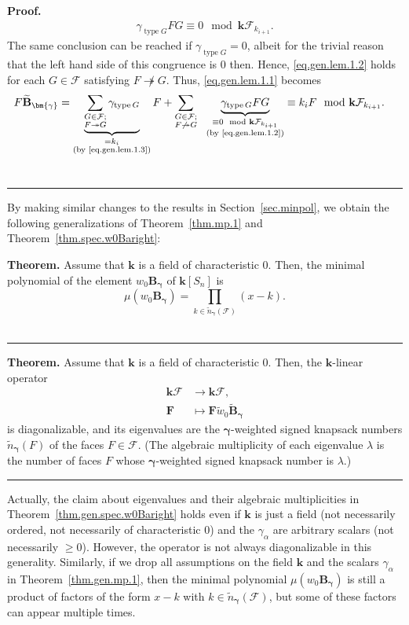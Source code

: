 \documentclass[12pt]{article}
\theoremstyle{definition}%
\newtheorem{thm}{Theorem}[section]
\theoremstyle{definition}%
\theoremstyle{remark}%
\newcommand{\tup}[1]{\left( #1 \right)}
\newcommand{\kk}{\mathbf{k}}
\newcommand{\ksn}{\kk\left[S_n\right]}
\newcommand{\kf}{\kk\mathcal{F}}
\newcommand{\BB}{\mathbf{B}}
\newcommand{\BBt}{\widetilde{\mathbf{B}}}
\newcommand{\FF}{\mathbf{F}}
\newcommand{\CF}{\mathcal{F}}
\newcommand{\bgamma}{\bm{\gamma}}
\newcommand{\wo}{w_0} %
\newcommand{\wotil}{\widetilde{w}_0}
\newcommand{\nn}{\widetilde{n}}%
\newcommand{\type}{\operatorname{type}}
\newcommand{\con}{\twoheadrightarrow} %
\newenvironment{thm}[1][Theorem]{\noindent\textbf{#1.} }{\ \rule{0.5em}{0.5em}}
\newenvironment{proof}[1][Proof]{\noindent\textbf{#1.} }{\ \rule{0.5em}{0.5em}}
\begin{document}
\begin{proof}
   \begin{align}
	   \gamma_{\type G} FG \equiv 0 \mod \kf_{k_{i+1}}.
	   \label{eq.gen.lem.1.2}
   \end{align}
   The same conclusion can be reached if $\gamma_{\type G} = 0$, albeit for the trivial reason that the left hand side of this congruence is $0$ then.
   Hence, \eqref{eq.gen.lem.1.2} holds for each $G \in \CF$ satisfying $F \not\con G$.
   Thus, \eqref{eq.gen.lem.1.1} becomes
   \begin{align*}
       F\BBt_{\bgamma}
       &= \underbrace{\sum_{\substack{G \in \CF; \\ F \con G}} \gamma_{\type G}}_{\substack{= k_i \\ \text{(by \eqref{eq.gen.lem.1.3})}}} F
	   + \sum_{\substack{G \in \CF; \\ F \not\con G}}\ \ \underbrace{\gamma_{\type G} FG}_{\substack{\equiv 0 \mod \kf_{k_{i+1}} \\ \text{(by \eqref{eq.gen.lem.1.2})}}}
	   \equiv k_i F \mod \kf_{k_{i+1}}.
   \end{align*}
\end{proof}

By making similar changes to the results in Section~\ref{sec.minpol}, we obtain the following generalizations of Theorem~\ref{thm.mp.1} and Theorem~\ref{thm.spec.w0Baright}:

\begin{thm}
\label{thm.gen.mp.1}
Assume that $\kk$ is a field of characteristic $0$.
Then, the minimal polynomial of the element $\wo\BB_{\bgamma}$ of $\ksn$ is
\[
\mu\tup{\wo\BB_{\bgamma}}
=
\prod_{k \in \nn_{\bgamma}\tup{\CF}}\tup{x-k}  .
\]
\end{thm}

\begin{thm}
\label{thm.gen.spec.w0Baright}
Assume that $\kk$ is a field of characteristic $0$.
Then, the $\kk$-linear operator
\begin{align*}
\kf  & \to \kf,\\
\FF  & \mapsto \FF\wotil\BBt_{\bgamma}
\end{align*}
is diagonalizable, and its eigenvalues are the $\bgamma$-weighted signed knapsack numbers
$\nn_{\bgamma}\tup{F} $ of the faces $F\in \CF$.
(The algebraic multiplicity of each eigenvalue $\lambda$ is the number of faces $F$
whose $\bgamma$-weighted signed knapsack number is $\lambda$.)
\end{thm}

Actually, the claim about eigenvalues and their algebraic multiplicities in Theorem~\ref{thm.gen.spec.w0Baright} holds even if $\kk$ is just a field (not necessarily ordered, not necessarily of characteristic $0$) and the $\gamma_\alpha$ are arbitrary scalars (not necessarily $\geq 0$).
However, the operator is not always diagonalizable in this generality.
Similarly, if we drop all assumptions on the field $\kk$ and the scalars $\gamma_\alpha$ in Theorem~\ref{thm.gen.mp.1}, then the minimal polynomial $\mu\tup{\wo\BB_{\bgamma}}$ is still a product of factors of the form $x - k$ with $k \in \nn_{\bgamma}\tup{\CF}$, but some of these factors can appear multiple times.
\end{document}
